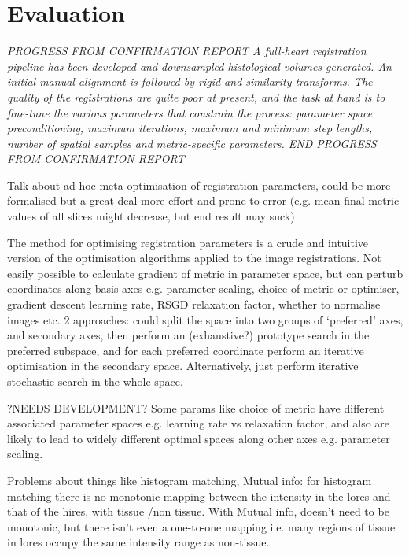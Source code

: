 \section{Evaluation} %
\label{sec:evaluation}

\textit{PROGRESS FROM CONFIRMATION REPORT 
A full-heart registration pipeline has been developed and downsampled histological volumes generated. An initial manual alignment is followed by rigid and similarity transforms. The quality of the registrations are quite poor at present, and the task at hand is to fine-tune the various parameters that constrain the process: parameter space preconditioning, maximum iterations, maximum and minimum step lengths, number of spatial samples and metric-specific parameters.
END PROGRESS FROM CONFIRMATION REPORT
}

    Talk about ad hoc meta-optimisation of registration parameters, could be more formalised but a great deal more effort and prone to error (e.g. mean final metric values of all slices might decrease, but end result may suck)
    
    The method for optimising registration parameters is a crude and intuitive version of the optimisation algorithms applied to the image registrations. Not easily possible to calculate gradient of metric in parameter space, but can perturb coordinates along basis axes e.g. parameter scaling, choice of metric or optimiser, gradient descent learning rate, RSGD relaxation factor, whether to normalise images etc. 2 approaches: could split the space into two groups of `preferred' axes, and secondary axes, then perform an (exhaustive?) prototype search in the preferred subspace, and for each preferred coordinate perform an iterative optimisation in the secondary space. Alternatively, just perform iterative stochastic search in the whole space.
    
    ?NEEDS DEVELOPMENT? Some params like choice of metric have different associated parameter spaces e.g. learning rate vs relaxation factor, and also are likely to lead to widely different optimal spaces along other axes e.g. parameter scaling.
    
    Problems about things like histogram matching, Mutual info: for histogram matching there is no monotonic mapping between the intensity in the lores and that of the hires, with tissue /non tissue. With Mutual info, doesn't need to be monotonic, but there isn't even a one-to-one mapping i.e. many regions of tissue in lores occupy the same intensity range as non-tissue.
    
